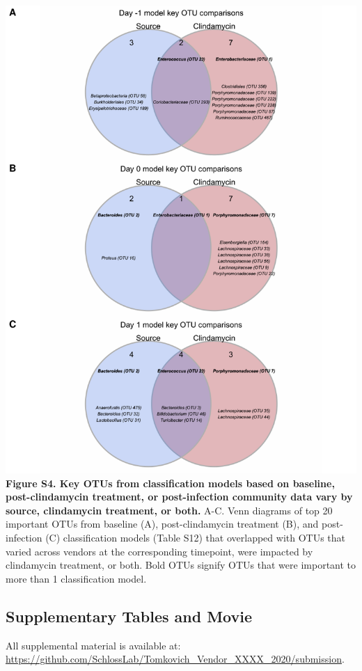 \documentclass[11pt,]{article}
\begin{document}
\includegraphics{figure_S4.pdf} \textbf{Figure S4. Key OTUs from
classification models based on baseline, post-clindamycin treatment, or
post-infection community data vary by source, clindamycin treatment, or
both.} A-C. Venn diagrams of top 20 important OTUs from baseline (A),
post-clindamycin treatment (B), and post-infection (C) classification
models (Table S12) that overlapped with OTUs that varied across vendors
at the corresponding timepoint, were impacted by clindamycin treatment,
or both. Bold OTUs signify OTUs that were important to more than 1
classification model.

\newpage

\subsection{Supplementary Tables and
Movie}\label{supplementary-tables-and-movie}

All supplemental material is available at:
\url{https://github.com/SchlossLab/Tomkovich_Vendor_XXXX_2020/submission}.
\end{document}
